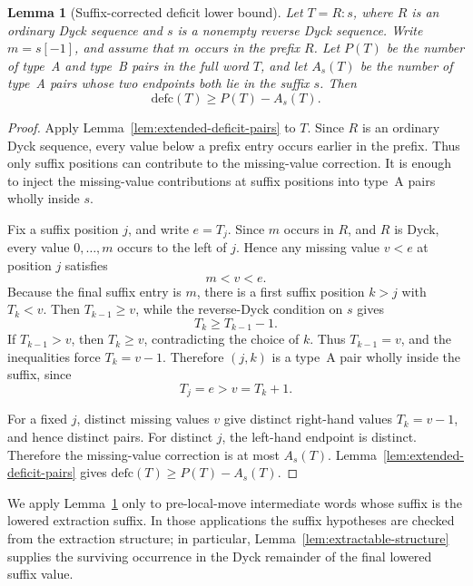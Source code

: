 \documentclass[11pt]{article}
\theoremstyle{plain}
\newtheorem{lemma}[theorem]{Lemma}
\theoremstyle{definition}
\theoremstyle{remark}
\newcommand{\defc}{\mathrm{defc}}
\begin{document}
\begin{lemma}[Suffix-corrected deficit lower bound]
\label{lem:suffix-corrected-deficit-lower-bound}
Let \(T=R:s\), where \(R\) is an ordinary Dyck sequence and \(s\) is a
nonempty reverse Dyck sequence.  Write \(m=s[-1]\), and assume that \(m\)
occurs in the prefix \(R\).  Let \(P(T)\) be the number of type~A and type~B
pairs in the full word \(T\), and let \(A_s(T)\) be the number of type~A pairs
whose two endpoints both lie in the suffix \(s\).  Then
\[
  \defc(T)\ge P(T)-A_s(T).
\]
\end{lemma}

\begin{proof}
Apply Lemma~\ref{lem:extended-deficit-pairs} to \(T\).  Since \(R\) is an
ordinary Dyck sequence, every value below a prefix entry occurs earlier in the
prefix.  Thus only suffix positions can contribute to the missing-value
correction.  It is enough to inject the missing-value contributions at suffix
positions into type~A pairs wholly inside \(s\).

Fix a suffix position \(j\), and write \(e=T_j\).  Since \(m\) occurs in
\(R\), and \(R\) is Dyck, every value \(0,\ldots,m\) occurs to the left of
\(j\).  Hence any missing value \(v<e\) at position \(j\) satisfies
\[
  m<v<e.
\]
Because the final suffix entry is \(m\), there is a first suffix position
\(k>j\) with \(T_k<v\).  Then \(T_{k-1}\ge v\), while the reverse-Dyck
condition on \(s\) gives
\[
  T_k\ge T_{k-1}-1.
\]
If \(T_{k-1}>v\), then \(T_k\ge v\), contradicting the choice of \(k\).  Thus
\(T_{k-1}=v\), and the inequalities force \(T_k=v-1\).  Therefore
\((j,k)\) is a type~A pair wholly inside the suffix, since
\[
  T_j=e>v=T_k+1.
\]

For a fixed \(j\), distinct missing values \(v\) give distinct right-hand
values \(T_k=v-1\), and hence distinct pairs.  For distinct \(j\), the
left-hand endpoint is distinct.  Therefore the missing-value correction is at
most \(A_s(T)\).  Lemma~\ref{lem:extended-deficit-pairs} gives
\(\defc(T)\ge P(T)-A_s(T)\).
\end{proof}

We apply Lemma~\ref{lem:suffix-corrected-deficit-lower-bound} only to
pre-local-move intermediate words whose suffix is the lowered extraction
suffix.  In those applications the suffix hypotheses are checked from the
extraction structure; in particular, Lemma~\ref{lem:extractable-structure}
supplies the surviving occurrence in the Dyck remainder of the final lowered
suffix value.
\end{document}
